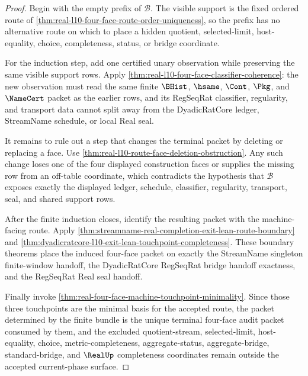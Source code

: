 \begin{proof}
Begin with the empty prefix of $\mathcal B$. The visible support is the fixed ordered route of \autoref{thm:real-l10-four-face-route-order-uniqueness}, so the prefix has no alternative route on which to place a hidden quotient, selected-limit, host-equality, choice, completeness, status, or bridge coordinate.

For the induction step, add one certified unary observation while preserving the same visible support rows. Apply \autoref{thm:real-l10-four-face-classifier-coherence}: the new observation must read the same finite $\BHist$, $\hsame$, $\Cont$, $\Pkg$, and $\NameCert$ packet as the earlier rows, and its RegSeqRat classifier, regularity, and transport data cannot split away from the DyadicRatCore ledger, StreamName schedule, or local Real seal.

It remains to rule out a step that changes the terminal packet by deleting or replacing a face. Use \autoref{thm:real-l10-route-face-deletion-obstruction}. Any such change loses one of the four displayed construction faces or supplies the missing row from an off-table coordinate, which contradicts the hypothesis that $\mathcal B$ exposes exactly the displayed ledger, schedule, classifier, regularity, transport, seal, and shared support rows.

After the finite induction closes, identify the resulting packet with the machine-facing route. Apply \autoref{thm:streamname-real-completion-exit-lean-route-boundary} and \autoref{thm:dyadicratcore-l10-exit-lean-touchpoint-completeness}. These boundary theorems place the induced four-face packet on exactly the StreamName singleton finite-window handoff, the DyadicRatCore RegSeqRat bridge handoff exactness, and the RegSeqRat Real seal handoff.

Finally invoke \autoref{thm:real-four-face-machine-touchpoint-minimality}. Since those three touchpoints are the minimal basis for the accepted route, the packet determined by the finite bundle is the unique terminal four-face audit packet consumed by them, and the excluded quotient-stream, selected-limit, host-equality, choice, metric-completeness, aggregate-status, aggregate-bridge, standard-bridge, and $\RealUp$ completeness coordinates remain outside the accepted current-phase surface.
\end{proof}

